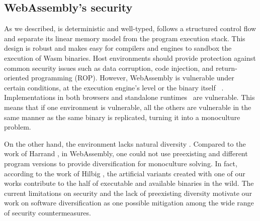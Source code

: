 







\subsection*{WebAssembly's security}

As we described, \wasm is deterministic and well-typed, follows a structured control flow and separate its linear memory model from the program execution stack. This design is robust \cite{WebAssemblySecurity} and makes easy for compilers and engines to sandbox the execution of Wasm binaries.
Host environments should provide protection against common security issues such as data corruption, code injection, and return-oriented programming (ROP). However, WebAssembly is vulnerable under certain conditions, at the execution engine's level \cite{ChromeZero} or the binary itself ~\cite{usenixWasm2020}.
Implementations in both browsers and standalone runtimes~\cite{Narayan2021Swivel} are vulnerable.
This means that if one environment is vulnerable, all the others are vulnerable in the same manner as the same \wasm binary is replicated, turning it into a monoculture problem.


On the other hand, the \wasm environment lacks natural diversity \cite{natural_diversity}. Compared to the work of Harrand \etal \citationneeded, in WebAssembly, one could not use preexisting and different program versions to provide diversification for monoculture solving. In fact, according to the work of Hilbig \etal \cite{Hilbig2021AnES}, the artificial variants created with one of our works contribute to the half of executable and available \wasm binaries in the wild. The current limitations on security and the lack of preexisting diversity motivate our work on software diversification as one possible mitigation among the wide range of security countermeasures. 

